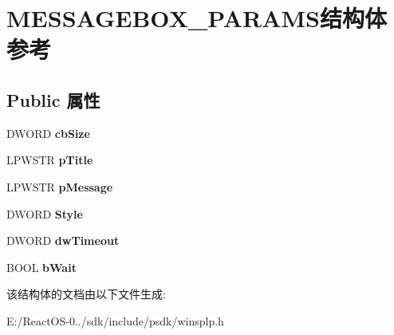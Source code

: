 \hypertarget{struct_m_e_s_s_a_g_e_b_o_x___p_a_r_a_m_s}{}\section{M\+E\+S\+S\+A\+G\+E\+B\+O\+X\+\_\+\+P\+A\+R\+A\+M\+S结构体 参考}
\label{struct_m_e_s_s_a_g_e_b_o_x___p_a_r_a_m_s}
\subsection*{Public 属性}
\begin{DoxyCompactItemize}
\item 
\mbox{\label{struct_m_e_s_s_a_g_e_b_o_x___p_a_r_a_m_s_a95d0bb3e749262c124d1852b0df9f284}} 
D\+W\+O\+RD {\bfseries cb\+Size}
\item 
\mbox{\label{struct_m_e_s_s_a_g_e_b_o_x___p_a_r_a_m_s_a12e24a226223145a1b85c7008e2f773b}} 
L\+P\+W\+S\+TR {\bfseries p\+Title}
\item 
\mbox{\label{struct_m_e_s_s_a_g_e_b_o_x___p_a_r_a_m_s_a09b5b3665b3709030c1bfb9aa565a97c}} 
L\+P\+W\+S\+TR {\bfseries p\+Message}
\item 
\mbox{\label{struct_m_e_s_s_a_g_e_b_o_x___p_a_r_a_m_s_a7f4a8bb5ad6c18ef44e559fac1f8caa8}} 
D\+W\+O\+RD {\bfseries Style}
\item 
\mbox{\label{struct_m_e_s_s_a_g_e_b_o_x___p_a_r_a_m_s_aaaa00473d3a63f25dbae5750b069d553}} 
D\+W\+O\+RD {\bfseries dw\+Timeout}
\item 
\mbox{\label{struct_m_e_s_s_a_g_e_b_o_x___p_a_r_a_m_s_a56560d6b82817a30bda4ce12400b955c}} 
B\+O\+OL {\bfseries b\+Wait}
\end{DoxyCompactItemize}


该结构体的文档由以下文件生成\+:\begin{DoxyCompactItemize}
\item 
E\+:/\+React\+O\+S-\/0../sdk/include/psdk/winsplp.\+h\end{DoxyCompactItemize}
